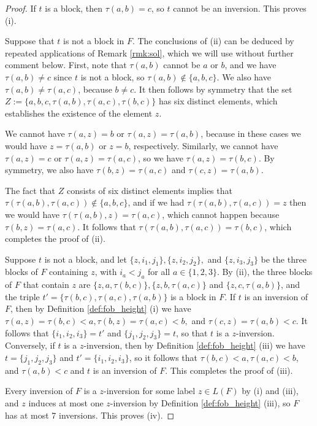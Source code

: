 \documentclass[11pt]{amsart}
\theoremstyle{plain}
\theoremstyle{definition}
\theoremstyle{remark}
\numberwithin{equation}{section}
\begin{document}
\begin{proof}  
  If $t$ is a block, then $\tau(a,b)=c$, so $t$ cannot be an
  inversion. This proves (i). 

  Suppose that $t$ is not a block in $F$. The conclusions of (ii) can be deduced
  by repeated applications of Remark \ref{rmk:sol}, which we will use without
  further comment below. First, note that $\tau(a,b)$ cannot be $a$ or $b$, and
  we have $\tau(a,b)\neq c$ since $t$ is not a block, so
  $\tau(a,b)\notin\{a,b,c\}$. We also have $\tau(a,b)\neq \tau(a,c)$, because
  $b\neq c$. It then follows by symmetry that the set
  $Z:=\{a,b,c,\tau(a,b),\tau(a,c), \tau(b,c)\}$ has six distinct elements, which
  establishes the existence of the element $z$. 

  We cannot have $\tau(a,z)=b$ or
  $\tau(a,z)=\tau(a,b)$, because in these cases we would have $z=\tau(a,b)$ or
  $z=b$, respectively. Similarly, we cannot have $\tau(a,z)=c$ or
  $\tau(a,z)=\tau(a,c)$, so we have $\tau(a,z)=\tau(b,c)$. By symmetry, we also
  have $\tau(b,z)=\tau(a,c)$ and $\tau(c,z)=\tau(a,b)$. 

  The fact that $Z$ consists of six distinct elements implies that
  $\tau(\tau(a,b),\tau(a,c))\notin \{a,b,c\}$, and if we had $\tau(\tau(a,b),
  \tau(a,c))=z$ then we would have $\tau(\tau(a,b),z)=\tau(a,c)$, which cannot
  happen because $\tau(b,z)=\tau(a,c)$. It follows that
  $\tau(\tau(a,b),\tau(a,c))=\tau(b,c)$, which completes the proof of (ii).
 
  Suppose $t$ is not a block, and let $\{z,i_1,j_1\}, \{z,i_2,j_2\},$ and
  $\{z,i_3,j_3\}$ be the three blocks of $F$ containing $z$, with $i_a<j_a$ for
  all $a\in \{1,2,3\}$. By (ii), the three blocks of $F$ that contain $z$ are
  $\{z,a,\tau(b,c)\}, \{z,b,\tau(a,c)\}$ and $\{z,c,\tau(a,b)\}$, and the triple
  $t'=\{\tau(b,c),\tau(a,c),\tau(a,b)\}$ is a block in $F$. If $t$ is an
  inversion of $F$, then by Definition \ref{def:fob_height} (i) we have
  $\tau(a,z)=\tau(b,c)<a, \tau(b,z)=\tau(a,c)<b,$ and $\tau(c,z)=\tau(a,b)<c$.
  It follows that $\{i_1,i_2,i_3\}=t'$ and $\{j_1,j_2,j_3\}=t$, so that $t$ is a
  $z$-inversion. Conversely, if $t$ is a $z$-inversion, then by Definition
  \ref{def:fob_height} (iii) we have $t=\{j_1,j_2,j_3\}$ and
  $t'=\{i_1,i_2,i_3\}$, so it follows that $\tau(b,c)<a, \tau(a,c)<b$, and
  $\tau(a,b)<c$ and $t$ is an inversion of $F$. This completes the proof of
  (iii).

  Every inversion of $F$ is a $z$-inversion for some label $z\in L(F)$ by (i)
and (iii), and $z$ induces at most one $z$-inversion by Definition
\ref{def:fob_height} (iii), so $F$ has at most 7 inversions. This proves (iv).
\end{proof}
\end{document}
